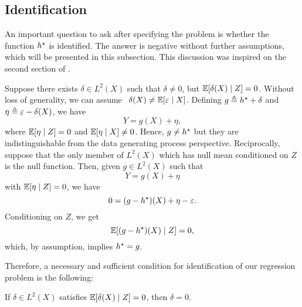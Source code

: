 \subsection{Identification}

An important question to ask after specifying the problem is whether the function $ h^{ \star } $ is identified.
The answer is negative without further assumptions, which will be presented in this subsection.
This discussion was inspired on the second section of \cite{newey2003}.

Suppose there exists $ \delta \in L^{ 2 } ( X ) $ such that $ \delta \neq 0 $, but $ \mathbb{E} [ \delta ( X ) \mid Z ] = 0 $.
Without loss of generality, we can assume\footnotemark~ $ \delta ( X ) \neq \mathbb{E} [ \varepsilon \mid X ] $.
Defining $ g \triangleq h^{ \star } + \delta $ and $ \eta \triangleq \varepsilon - \delta ( X ) $, we have
\begin{equation*}
    Y = g ( X ) + \eta
,\end{equation*}
where $ \mathbb{E} [ \eta \mid Z ] = 0 $ and $ \mathbb{E} [ \eta \mid X ] \neq 0 $.
Hence, $ g \neq h^{ \star } $ but they are indistinguishable from the data generating process perspective.
Reciprocally, suppose that the only member of $ L^{ 2 } ( X ) $ which has null mean conditioned on $ Z $ is the null function.
Then, given $ g \in L^{ 2 } ( X ) $ such that
\begin{equation*}
    Y = g ( X ) + \eta
\end{equation*}
with $ \mathbb{E} [ \eta \mid Z ] = 0 $, we have
\begin{equation*}
    0 = ( g - h^{ \star } ) ( X ) + \eta - \varepsilon
.\end{equation*}
Conditioning on $ Z $, we get
\begin{equation*}
    \mathbb{E} [ ( g - h^{ \star } ) ( X ) \mid Z ] = 0
,\end{equation*}
which, by assumption, implies $ h^{ \star } = g $.

Therefore, a necessary and sufficient condition for identification of our regression problem is the following:
\begin{assump*}[Identification]
    If $ \delta \in L^{ 2 } ( X ) $ satisfies $ \mathbb{E} [ \delta ( X ) \mid Z ] = 0 $, then $ \delta = 0 $.
\end{assump*}

